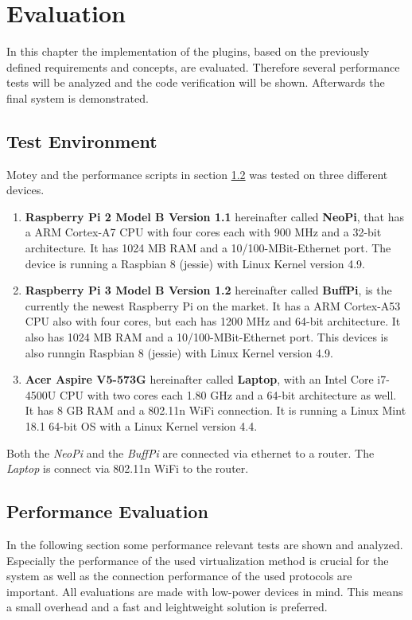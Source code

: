 \chapter{Evaluation}
\label{chapter:evaluation}
\minitoc\vspace{.5cm}
In this chapter the implementation of the plugins, based on the previously defined requirements and concepts, are evaluated.
Therefore several performance tests will be analyzed and the code verification will be shown.
Afterwards the final system is demonstrated.

\section{Test Environment}
\label{section:test-environment}
Motey and the performance scripts in section \ref{section:performance-evaluation} was tested on three different devices.
\begin{enumerate}
  \item \textbf{Raspberry Pi 2 Model B Version 1.1} hereinafter called \textbf{NeoPi}, that has a ARM Cortex-A7 \ac{CPU} with four cores each with 900 MHz and a 32-bit architecture. It has 1024 MB \ac{RAM} and a 10/100-MBit-Ethernet port. The device is running a Raspbian 8 (jessie) with Linux Kernel version 4.9.
  \item \textbf{Raspberry Pi 3 Model B Version 1.2} hereinafter called \textbf{BuffPi}, is the currently the newest Raspberry Pi on the market. It has a ARM Cortex-A53 \ac{CPU} also with four cores, but each has 1200 MHz and 64-bit architecture. It also has 1024 MB \ac{RAM} and a 10/100-MBit-Ethernet port.  This devices is also runngin Raspbian 8 (jessie) with Linux Kernel version 4.9.
  \item \textbf{Acer Aspire V5-573G} hereinafter called \textbf{Laptop}, with an Intel Core i7-4500U \ac{CPU} with two cores each 1.80 GHz and a 64-bit architecture as well. It has 8 GB \ac{RAM} and a 802.11n WiFi connection. It is running a Linux Mint 18.1  64-bit \ac{OS} with a Linux Kernel version 4.4.
\end{enumerate}

Both the \textit{NeoPi} and the \textit{BuffPi} are connected via ethernet to a router.
The \textit{Laptop} is connect via 802.11n WiFi to the router.

\section{Performance Evaluation}
\label{section:performance-evaluation}
In the following section some performance relevant tests are shown and analyzed.
Especially the performance of the used virtualization method is crucial for the system as well as the connection performance of the used protocols are important.
All evaluations are made with low-power devices in mind.
This means a small overhead and a fast and leightweight solution is preferred.

